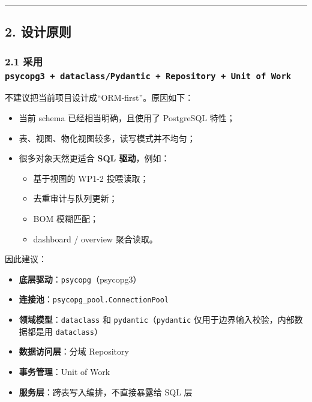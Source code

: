 \documentclass[UTF8]{ctexart}
\providecommand{\tightlist}{%
  \setlength{\itemsep}{0pt}\setlength{\parskip}{0pt}}
\begin{document}
\begin{center}\rule{0.5\linewidth}{0.5pt}\end{center}

\hypertarget{ux8bbeux8ba1ux539fux5219}{%
\subsection{2. 设计原则}\label{ux8bbeux8ba1ux539fux5219}}

\hypertarget{ux91c7ux7528-psycopg3-dataclasspydantic-repository-unit-of-work}{%
\subsubsection{\texorpdfstring{2.1 采用
\texttt{psycopg3\ +\ dataclass/Pydantic\ +\ Repository\ +\ Unit\ of\ Work}}{2.1 采用 psycopg3 + dataclass/Pydantic + Repository + Unit of Work}}\label{ux91c7ux7528-psycopg3-dataclasspydantic-repository-unit-of-work}}

不建议把当前项目设计成``ORM-first''。原因如下：

\begin{itemize}
\tightlist
\item
  当前 schema 已经相当明确，且使用了 PostgreSQL 特性；
\item
  表、视图、物化视图较多，读写模式并不均匀；
\item
  很多对象天然更适合 \textbf{SQL 驱动}，例如：

  \begin{itemize}
  \tightlist
  \item
    基于视图的 WP1-2 投喂读取；
  \item
    去重审计与队列更新；
  \item
    BOM 模糊匹配；
  \item
    dashboard / overview 聚合读取。
  \end{itemize}
\end{itemize}

因此建议：

\begin{itemize}
\tightlist
\item
  \textbf{底层驱动}：\texttt{psycopg}（psycopg3）
\item
  \textbf{连接池}：\texttt{psycopg\_pool.ConnectionPool}
\item
  \textbf{领域模型}：\texttt{dataclass} 和
  \texttt{pydantic}（\texttt{pydantic}
  仅用于边界输入校验，内部数据都是用 \texttt{dataclass}）
\item
  \textbf{数据访问层}：分域 Repository
\item
  \textbf{事务管理}：Unit of Work
\item
  \textbf{服务层}：跨表写入编排，不直接暴露给 SQL 层
\end{itemize}
\end{document}
